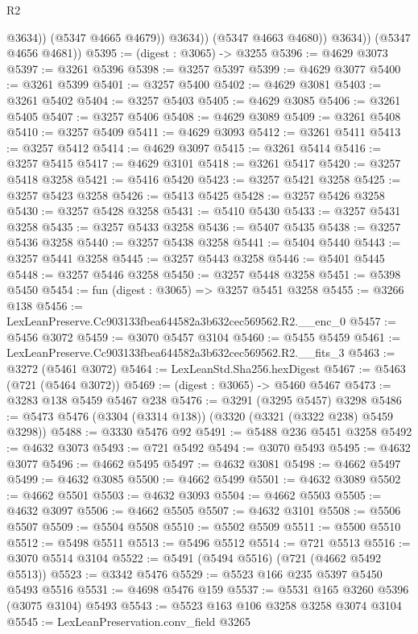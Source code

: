 \begin{lexlean}{R2}
\begin{coremodule}
                      @3634))
                  (@5347 @4665 @4679))
                @3634))
            (@5347 @4663 @4680))
          @3634))
      (@5347 @4656 @4681))
@5395 := (digest : @3065) -> @3255
@5396 := @4629 @3073
@5397 := @3261 @5396
@5398 := @3257 @5397
@5399 := @4629 @3077
@5400 := @3261 @5399
@5401 := @3257 @5400
@5402 := @4629 @3081
@5403 := @3261 @5402
@5404 := @3257 @5403
@5405 := @4629 @3085
@5406 := @3261 @5405
@5407 := @3257 @5406
@5408 := @4629 @3089
@5409 := @3261 @5408
@5410 := @3257 @5409
@5411 := @4629 @3093
@5412 := @3261 @5411
@5413 := @3257 @5412
@5414 := @4629 @3097
@5415 := @3261 @5414
@5416 := @3257 @5415
@5417 := @4629 @3101
@5418 := @3261 @5417
@5420 := @3257 @5418 @3258
@5421 := @5416 @5420
@5423 := @3257 @5421 @3258
@5425 := @3257 @5423 @3258
@5426 := @5413 @5425
@5428 := @3257 @5426 @3258
@5430 := @3257 @5428 @3258
@5431 := @5410 @5430
@5433 := @3257 @5431 @3258
@5435 := @3257 @5433 @3258
@5436 := @5407 @5435
@5438 := @3257 @5436 @3258
@5440 := @3257 @5438 @3258
@5441 := @5404 @5440
@5443 := @3257 @5441 @3258
@5445 := @3257 @5443 @3258
@5446 := @5401 @5445
@5448 := @3257 @5446 @3258
@5450 := @3257 @5448 @3258
@5451 := @5398 @5450
@5454 := fun (digest : @3065) => @3257 @5451 @3258
@5455 := @3266 @138
@5456 := LexLeanPreserve.Cc903133fbea644582a3b632cec569562.R2.__enc_0
@5457 := @5456 @3072
@5459 := @3070 @5457 @3104
@5460 := @5455 @5459
@5461 := LexLeanPreserve.Cc903133fbea644582a3b632cec569562.R2.__fits_3
@5463 := @3272 (@5461 @3072)
@5464 := LexLeanStd.Sha256.hexDigest
@5467 := @5463 (@721 (@5464 @3072))
@5469 := (digest : @3065) -> @5460 @5467
@5473 := @3283 @138 @5459 @5467 @238
@5476 := @3291 (@3295 @5457) @3298
@5486 := @5473 @5476 (@3304 (@3314 @138)) (@3320 (@3321 (@3322 @238) @5459 @3298))
@5488 := @3330 @5476 @92
@5491 := @5488 @236 @5451 @3258
@5492 := @4632 @3073
@5493 := @721 @5492
@5494 := @3070 @5493
@5495 := @4632 @3077
@5496 := @4662 @5495
@5497 := @4632 @3081
@5498 := @4662 @5497
@5499 := @4632 @3085
@5500 := @4662 @5499
@5501 := @4632 @3089
@5502 := @4662 @5501
@5503 := @4632 @3093
@5504 := @4662 @5503
@5505 := @4632 @3097
@5506 := @4662 @5505
@5507 := @4632 @3101
@5508 := @5506 @5507
@5509 := @5504 @5508
@5510 := @5502 @5509
@5511 := @5500 @5510
@5512 := @5498 @5511
@5513 := @5496 @5512
@5514 := @721 @5513
@5516 := @3070 @5514 @3104
@5522 := @5491 (@5494 @5516) (@721 (@4662 @5492 @5513))
@5523 := @3342 @5476
@5529 := @5523 @166 @235 @5397 @5450 @5493 @5516
@5531 := @4698 @5476 @159
@5537 := @5531 @165 @3260 @5396 (@3075 @3104) @5493
@5543 := @5523 @163 @106 @3258 @3258 @3074 @3104
@5545 := LexLeanPreservation.conv_field @3265

\end{coremodule}
\end{lexlean}
